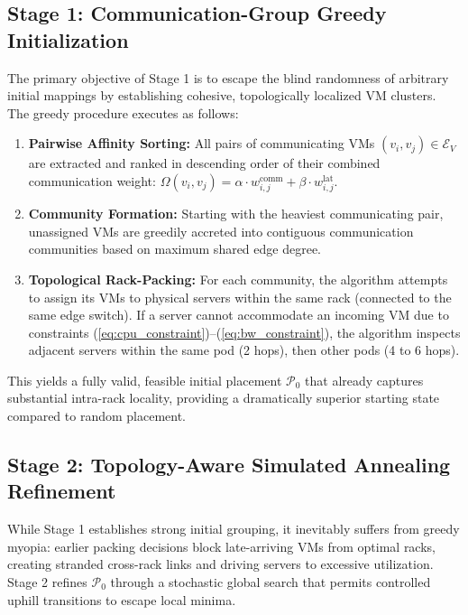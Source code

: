 \documentclass[conference]{IEEEtran}
\begin{document}
\subsection{Stage 1: Communication-Group Greedy Initialization}
The primary objective of Stage 1 is to escape the blind randomness of arbitrary initial mappings by establishing cohesive, topologically localized VM clusters. The greedy procedure executes as follows:
\begin{enumerate}
    \item \textbf{Pairwise Affinity Sorting:} All pairs of communicating VMs $(v_i, v_j) \in \mathcal{E}_V$ are extracted and ranked in descending order of their combined communication weight:
    $\Omega(v_i, v_j) = \alpha \cdot w_{i,j}^{\mathrm{comm}} + \beta \cdot w_{i,j}^{\mathrm{lat}}$.
    \item \textbf{Community Formation:} Starting with the heaviest communicating pair, unassigned VMs are greedily accreted into contiguous communication communities based on maximum shared edge degree.
    \item \textbf{Topological Rack-Packing:} For each community, the algorithm attempts to assign its VMs to physical servers within the same rack (connected to the same edge switch). If a server cannot accommodate an incoming VM due to constraints (\ref{eq:cpu_constraint})--(\ref{eq:bw_constraint}), the algorithm inspects adjacent servers within the same pod (2 hops), then other pods (4 to 6 hops).
\end{enumerate}
This yields a fully valid, feasible initial placement $\mathcal{P}_0$ that already captures substantial intra-rack locality, providing a dramatically superior starting state compared to random placement.

\subsection{Stage 2: Topology-Aware Simulated Annealing Refinement}
While Stage 1 establishes strong initial grouping, it inevitably suffers from greedy myopia: earlier packing decisions block late-arriving VMs from optimal racks, creating stranded cross-rack links and driving servers to excessive utilization. Stage 2 refines $\mathcal{P}_0$ through a stochastic global search that permits controlled uphill transitions to escape local minima.
\end{document}
